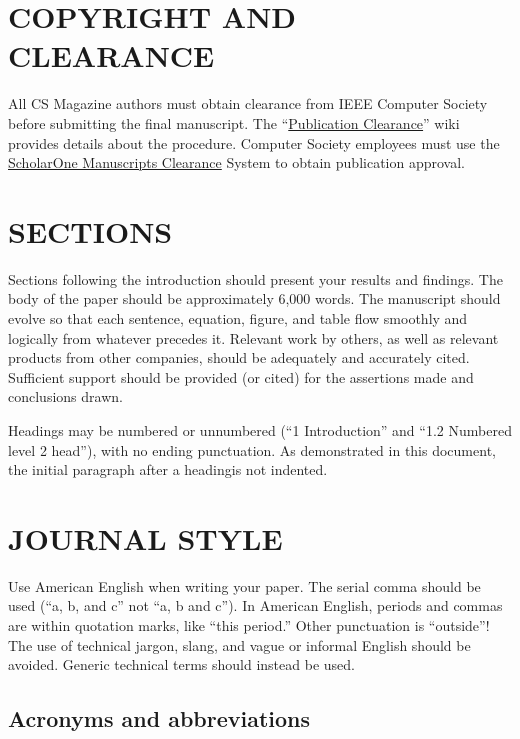 \documentclass{IEEEcsmag}
\begin{document}
\section{COPYRIGHT AND CLEARANCE}

All CS Magazine authors must obtain clearance from IEEE Computer Society before submitting the final manuscript. The ``\href{https://apps.na.collabserv.com/wikis/home?lang=en-us#!/wiki/W18e544042a85_4b63_915a_1d1ed2cf8338/page/Publication\%20clearance}{Publication Clearance}'' wiki provides details about the procedure. Computer Society employees must use the \href{https://mc.manuscriptcentral.com/cs-ieee}{ScholarOne  Manuscripts Clearance} System to obtain publication approval.

\section{SECTIONS}

Sections following the introduction should present your results and findings. The body of the paper should be approximately 6,000 words. The manuscript should evolve so that each sentence, equation, figure, and table flow smoothly and logically from whatever precedes it. Relevant work by others, as well as relevant products from other companies, should be adequately and accurately cited. Sufficient support should be provided (or cited) for the assertions made and conclusions drawn.

Headings may be numbered or unnumbered (``1 Introduction'' and ``1.2 Numbered level 2 head''), with no ending punctuation. As demonstrated in this document, the initial paragraph after a headingis not indented.

\section{JOURNAL STYLE}

Use American English when writing your paper. The serial comma should be used (``a, b, and c'' not ``a, b and c''). In American English, periods and commas are within quotation marks, like ``this period.'' Other punctuation is ``outside''! The use of technical jargon, slang, and vague or informal English should be avoided. Generic technical terms should instead be used.

\subsection{Acronyms and abbreviations}
\end{document}
